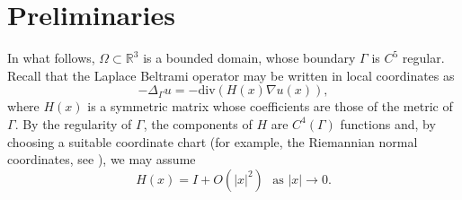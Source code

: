 \documentclass[10pt,a4paper]{article}
\newcommand{\RR}{\mathbb{R}}
\newcommand{\divg}{\mathrm{div}}
\newcommand{\faskip}{\hspace{8pt}}
\numberwithin{equation}{section}
\begin{document}
\section{Preliminaries}
\label{sect:preliminaries}

In what follows, $\Omega \subset \RR^{3}$ is a bounded domain, whose boundary $\Gamma$ is $C^5$ regular. Recall that the Laplace Beltrami operator may be written in local coordinates as
\[-\Delta_{\Gamma}u = -\divg(H(x) \nabla u(x)),\]
where $H(x)$ is a symmetric matrix whose coefficients are those of the metric of $\Gamma$. By the regularity of $\Gamma$, the components of $H$ are $C^4(\Gamma)$ functions and, by choosing a suitable coordinate chart (for example, the Riemannian normal coordinates, see \cite[Section 5.5]{Pet16}), we may assume
\begin{equation}
	\label{eq:metric}
	H(x) = I + O(|x|^{2})\faskip \text{as } |x| \rightarrow 0. 
\end{equation}
\end{document}
